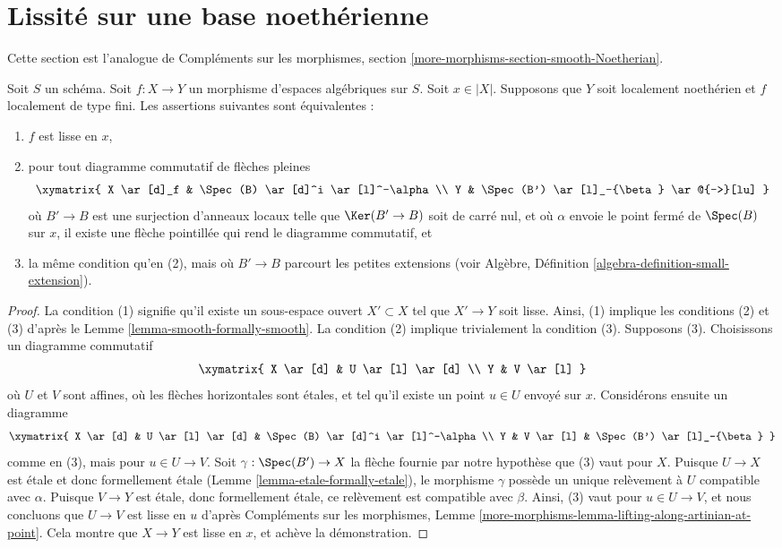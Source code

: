 \section{Lissité sur une base noethérienne}
\label{section-smooth-Noetherian}

\noindent
Cette section est l'analogue de
Compléments sur les morphismes, section \ref{more-morphisms-section-smooth-Noetherian}.

\begin{lemma}
\label{lemma-lifting-along-artinian-at-point}
Soit $S$ un schéma. Soit $f : X \to Y$ un morphisme d'espaces algébriques
sur $S$. Soit $x \in |X|$.
Supposons que $Y$ soit localement noethérien et $f$ localement de type fini.
Les assertions suivantes sont équivalentes :
\begin{enumerate}
\item $f$ est lisse en $x$,
\item pour tout diagramme commutatif de flèches pleines
$$
\xymatrix{
X \ar[d]_f & \Spec(B) \ar[d]^i \ar[l]^-\alpha \\
Y & \Spec(B') \ar[l]_-{\beta} \ar@{-->}[lu]
}
$$
où $B' \to B$ est une surjection d'anneaux locaux telle que
$\Ker(B' \to B)$ soit de carré nul, et où $\alpha$ envoie le
point fermé de $\Spec(B)$ sur $x$, il existe
une flèche pointillée qui rend le diagramme commutatif, et
\item la même condition qu'en (2), mais où $B' \to B$ parcourt les petites
extensions (voir Algèbre, Définition \ref{algebra-definition-small-extension}).
\end{enumerate}
\end{lemma}

\begin{proof}
La condition (1) signifie qu'il existe un sous-espace ouvert $X' \subset X$
tel que $X' \to Y$ soit lisse. Ainsi, (1) implique les conditions (2) et (3) d'après le
Lemme \ref{lemma-smooth-formally-smooth}. La condition (2) implique
trivialement la condition (3). Supposons (3). Choisissons un diagramme commutatif
$$
\xymatrix{
X \ar[d] & U \ar[l] \ar[d] \\
Y & V \ar[l]
}
$$
où $U$ et $V$ sont affines, où les flèches horizontales sont étales, et
tel qu'il existe un point $u \in U$ envoyé sur $x$. Considérons ensuite
un diagramme
$$
\xymatrix{
X \ar[d] & U \ar[l] \ar[d] & \Spec(B) \ar[d]^i \ar[l]^-\alpha  \\
Y & V \ar[l] & \Spec(B') \ar[l]_-{\beta}
}
$$
comme en (3), mais pour $u \in U \to V$. Soit $\gamma : \Spec(B') \to X$
la flèche fournie par notre hypothèse que (3) vaut pour $X$.
Puisque $U \to X$ est étale et
donc formellement étale (Lemme \ref{lemma-etale-formally-etale}),
le morphisme $\gamma$
possède un unique relèvement à $U$ compatible avec $\alpha$. Puisque
$V \to Y$ est étale, donc formellement étale, ce relèvement est compatible
avec $\beta$. Ainsi, (3) vaut pour $u \in U \to V$, et nous concluons
que $U \to V$ est lisse en $u$ d'après
Compléments sur les morphismes, Lemme
\ref{more-morphisms-lemma-lifting-along-artinian-at-point}.
Cela montre que $X \to Y$ est lisse en $x$, et
achève la démonstration.
\end{proof}

